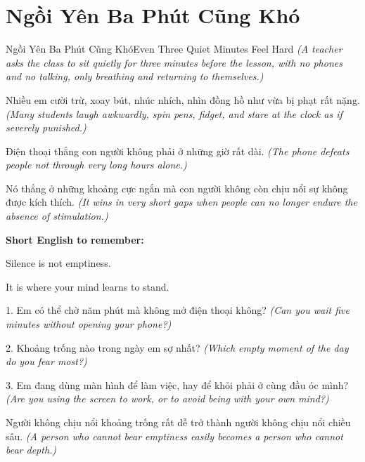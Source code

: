 \section{Ngồi Yên Ba Phút Cũng Khó}
\begin{truyen}{Ngồi Yên Ba Phút Cũng Khó}{Even Three Quiet Minutes Feel Hard}
\textit{(A teacher asks the class to sit quietly for three minutes before the lesson, with no phones and no talking, only breathing and returning to themselves.)}

Nhiều em cười trừ, xoay bút, nhúc nhích, nhìn đồng hồ như vừa bị phạt rất nặng.
\textit{(Many students laugh awkwardly, spin pens, fidget, and stare at the clock as if severely punished.)}

\end{truyen}

\begin{baihoc}
Điện thoại thắng con người không phải ở những giờ rất dài.
\textit{(The phone defeats people not through very long hours alone.)}

Nó thắng ở những khoảng cực ngắn mà con người không còn chịu nổi sự không được kích thích.
\textit{(It wins in very short gaps when people can no longer endure the absence of stimulation.)}
\end{baihoc}

\begin{ghinhoanh}
\textbf{Short English to remember:}

Silence is not emptiness.

It is where your mind learns to stand.
\end{ghinhoanh}

\begin{tuhocnhanh}
1. Em có thể chờ năm phút mà không mở điện thoại không? \textit{(Can you wait five minutes without opening your phone?)}

2. Khoảng trống nào trong ngày em sợ nhất? \textit{(Which empty moment of the day do you fear most?)}

3. Em đang dùng màn hình để làm việc, hay để khỏi phải ở cùng đầu óc mình? \textit{(Are you using the screen to work, or to avoid being with your own mind?)}
\end{tuhocnhanh}

\begin{tongketchuong}
Người không chịu nổi khoảng trống rất dễ trở thành người không chịu nổi chiều sâu.
\textit{(A person who cannot bear emptiness easily becomes a person who cannot bear depth.)}
\end{tongketchuong}

\ngancach